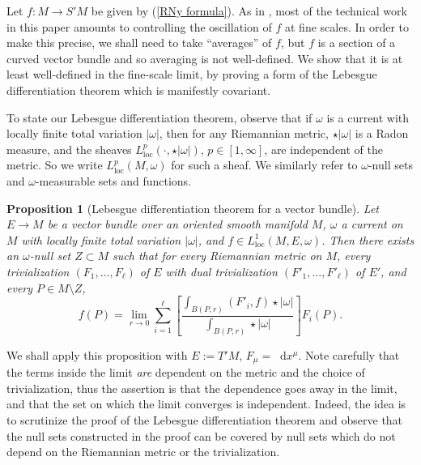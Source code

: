 \documentclass[reqno,11pt]{amsart}
\newcommand*\dif{\mathop{}\!\mathrm{d}}
\newcommand{\loc}{\mathrm{loc}}
\newtheorem{proposition}[theorem]{Proposition}
\theoremstyle{definition}
\numberwithin{equation}{section}
\begin{document}
Let $f: M \to S'M$ be given by (\ref{RNy formula}).
As in \cite{Miranda66, Giusti77}, most of the technical work in this paper amounts to controlling the oscillation of $f$ at fine scales.
In order to make this precise, we shall need to take ``averages'' of $f$, but $f$ is a section of a curved vector bundle and so averaging is not well-defined.
We show that it is at least well-defined in the fine-scale limit, by proving a form of the Lebesgue differentiation theorem which is manifestly covariant.

To state our Lebesgue differentiation theorem, observe that if $\omega$ is a current with locally finite total variation $|\omega|$, then for any Riemannian metric, $\star|\omega|$ is a Radon measure, and the sheaves $L^p_\loc(\cdot, \star |\omega|)$, $p \in [1, \infty]$, are independent of the metric.
So we write $L^p_\loc(M, \omega)$ for such a sheaf.
We similarly refer to $\omega$-null sets and $\omega$-measurable sets and functions.

\begin{proposition}[Lebesgue differentiation theorem for a vector bundle]\label{LebesgueDiff}
Let $E \to M$ be a vector bundle over an oriented smooth manifold $M$, $\omega$ a current on $M$ with locally finite total variation $|\omega|$, and $f \in L^1_\loc(M, E, \omega)$.
Then there exists an $\omega$-null set $Z \subset M$ such that for every Riemannian metric on $M$, every trivialization $(F_1, \dots, F_\ell)$ of $E$ with dual trivialization $(F'_1, \dots, F'_\ell)$ of $E'$, and every $P \in M \setminus Z$,
$$f(P) = \lim_{r \to 0} \sum_{i=1}^\ell \left[\frac{\int_{B(P, r)} (F'_i, f) \star |\omega|}{\int_{B(P, r)} \star |\omega|}\right] F_i(P).$$
\end{proposition}

We shall apply this proposition with $E := T'M$, $F_\mu = \dif x^\mu$.
Note carefully that the terms inside the limit \emph{are} dependent on the metric and the choice of trivialization, thus the assertion is that the dependence goes away in the limit, and that the set on which the limit converges is independent.
Indeed, the idea is to scrutinize the proof of the Lebesgue differentiation theorem \cite[Chapter 3, Theorem 1.3]{stein2009real} and observe that the null sets constructed in the proof can be covered by null sets which do not depend on the Riemannian metric or the trivialization.
\end{document}
